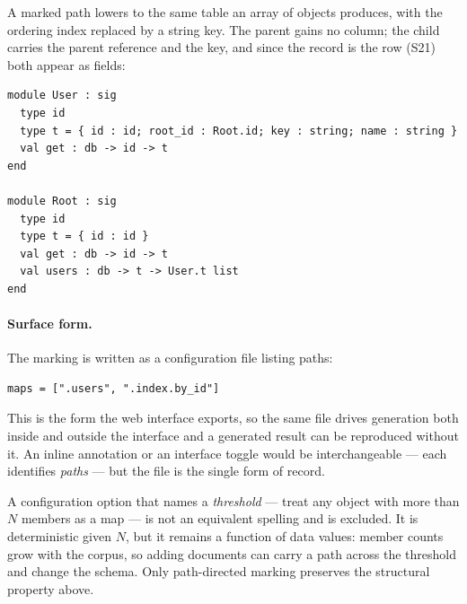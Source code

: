 
A marked path lowers to the same table an array of objects produces, with the
ordering index replaced by a string key. The parent gains no column; the child
carries the parent reference and the key, and since the record is the row
(S21) both appear as fields:

\begin{lstlisting}[style=ml]
module User : sig
  type id
  type t = { id : id; root_id : Root.id; key : string; name : string }
  val get : db -> id -> t
end

module Root : sig
  type id
  type t = { id : id }
  val get : db -> id -> t
  val users : db -> t -> User.t list
end
\end{lstlisting}

\paragraph{Surface form.} The marking is written as a configuration file
listing paths:

\begin{lstlisting}[style=json]
maps = [".users", ".index.by_id"]
\end{lstlisting}

This is the form the web interface exports, so the same file drives generation
both inside and outside the interface and a generated result can be reproduced
without it. An inline annotation or an interface toggle would be
interchangeable --- each identifies \emph{paths} --- but the file is the
single form of record.

A configuration option that names a \emph{threshold} --- treat any object with
more than $N$ members as a map --- is not an equivalent spelling and is
excluded. It is deterministic given $N$, but it remains a function of data
values: member counts grow with the corpus, so adding documents can carry a
path across the threshold and change the schema. Only path-directed marking
preserves the structural property above.


